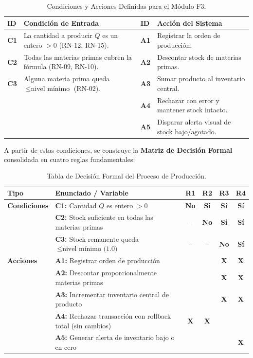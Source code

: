 \documentclass[11pt,a4paper]{article}
\begin{document}
\begin{table}[htbp]
\centering
\small
\begin{tabularx}{\textwidth}{p{1.2cm} X p{1.2cm} X}
\toprule
\textbf{ID} & \textbf{Condición de Entrada} & \textbf{ID} & \textbf{Acción del Sistema} \\
\midrule
\textbf{C1} & La cantidad a producir $Q$ es un entero $>0$ (RN-12, RN-15). & \textbf{A1} & Registrar la orden de producción. \\
\textbf{C2} & Todas las materias primas cubren la fórmula (RN-09, RN-10). & \textbf{A2} & Descontar stock de materias primas. \\
\textbf{C3} & Alguna materia prima queda $\le \text{nivel mínimo}$ (RN-02). & \textbf{A3} & Sumar producto al inventario central. \\
& & \textbf{A4} & Rechazar con error y mantener stock intacto. \\
& & \textbf{A5} & Disparar alerta visual de stock bajo/agotado. \\
\bottomrule
\end{tabularx}
\caption{Condiciones y Acciones Definidas para el Módulo F3.}\label{tab:td_condiciones}
\end{table}

A partir de estas condiciones, se construye la \textbf{Matriz de Decisión Formal} consolidada en cuatro reglas fundamentales:

\begin{table}[htbp]
\centering
\small
\begin{tabularx}{\textwidth}{l X c c c c}
\toprule
\textbf{Tipo} & \textbf{Enunciado / Variable} & \textbf{R1} & \textbf{R2} & \textbf{R3} & \textbf{R4} \\
\midrule
\textbf{Condiciones} & \textbf{C1:} Cantidad $Q$ es entero $>0$ & \textbf{No} & \textbf{Sí} & \textbf{Sí} & \textbf{Sí} \\
& \textbf{C2:} Stock suficiente en todas las materias primas & -- & \textbf{No} & \textbf{Sí} & \textbf{Sí} \\
& \textbf{C3:} Stock remanente queda $\le \text{nivel mínimo (1.0)}$ & -- & -- & \textbf{No} & \textbf{Sí} \\
\midrule
\textbf{Acciones} & \textbf{A1:} Registrar orden de producción & & & \textbf{X} & \textbf{X} \\
& \textbf{A2:} Descontar proporcionalmente materias primas & & & \textbf{X} & \textbf{X} \\
& \textbf{A3:} Incrementar inventario central de producto & & & \textbf{X} & \textbf{X} \\
& \textbf{A4:} Rechazar transacción con rollback total (sin cambios) & \textbf{X} & \textbf{X} & & \\
& \textbf{A5:} Generar alerta de inventario bajo o en cero & & & & \textbf{X} \\
\bottomrule
\end{tabularx}
\caption{Tabla de Decisión Formal del Proceso de Producción.}\label{tab:td_produccion}
\end{table}
\end{document}
